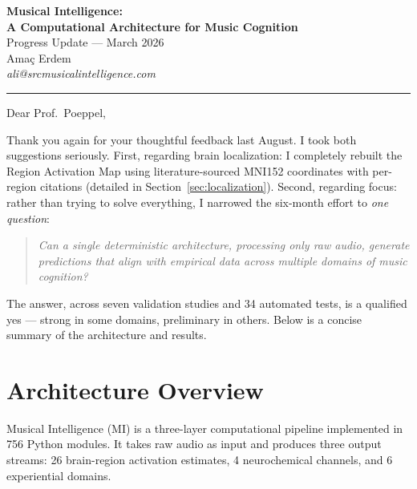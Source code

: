 \documentclass[11pt]{article}
\begin{document}
\begin{center}
{\Large\bfseries Musical Intelligence:\\[3pt]
A Computational Architecture for Music Cognition}\\[10pt]
{\large Progress Update — March 2026}\\[6pt]
{\normalsize Ama\c{c} Erdem}\\[2pt]
{\small\itshape ali@srcmusicalintelligence.com}\\[12pt]
\rule{0.7\textwidth}{0.4pt}
\end{center}

\vspace{6pt}

\noindent Dear Prof.\ Poeppel,

\smallskip
\noindent Thank you again for your thoughtful feedback last August. I took both suggestions seriously. First, regarding brain localization: I completely rebuilt the Region Activation Map using literature-sourced MNI152 coordinates with per-region citations (detailed in Section~\ref{sec:localization}). Second, regarding focus: rather than trying to solve everything, I narrowed the six-month effort to \emph{one question}:

\begin{quote}
\itshape Can a single deterministic architecture, processing only raw audio, generate predictions that align with empirical data across multiple domains of music cognition?
\end{quote}

\noindent The answer, across seven validation studies and 34 automated tests, is a qualified yes --- strong in some domains, preliminary in others. Below is a concise summary of the architecture and results.

\section{Architecture Overview}

Musical Intelligence (MI) is a three-layer computational pipeline implemented in 756 Python modules. It takes raw audio as input and produces three output streams: 26 brain-region activation estimates, 4 neurochemical channels, and 6 experiential domains.
\end{document}
